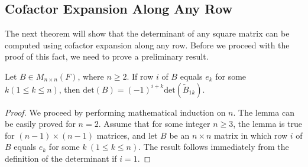 \subsection{Cofactor Expansion Along Any Row}
The next theorem will show that the determinant of any square matrix can be computed using cofactor expansion along any row. Before we proceed with the proof of this fact, we need to prove a preliminary result.
\begin{lemma}
    Let \( B \in {M}_{n \times n}(F)  \), where \( n \geq 2 \). If row \( i  \) of \( B  \) equals \( {e}_{k } \) for some \( k (1 \leq k \leq n) \), then \( \text{det}(B) = (-1)^{i+k } \text{det}({\tilde{B}}_{1k }) \).
\end{lemma}
\begin{proof}
We proceed by performing mathematical induction on \( n  \). The lemma can be easily proved for \( n = 2  \). Assume that for some integer \( n \geq 3  \), the lemma is true for \( (n-1) \times (n-1) \) matrices, and let \( B  \) be an \( n \times n  \) matrix in which row \( i  \) of \( B  \) equals \( {e}_{k}  \) for some \(  k \  (1 \leq k \leq n) \). The result follows immediately from the definition of the determinant if \( i =1  \).



\end{proof}
